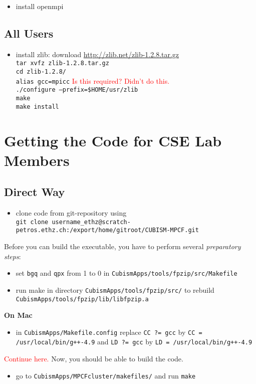 \documentclass[a4paper,10pt]{article}
\begin{document}
\begin{itemize}
\item install openmpi
\end{itemize}

\subsection*{All Users}

\begin{itemize}
\item install zlib: download \url{http://zlib.net/zlib-1.2.8.tar.gz}\\
         \texttt{tar xvfz zlib-1.2.8.tar.gz}\\
         \texttt{cd zlib-1.2.8/}\\
         \texttt{alias gcc=mpicc} \textcolor{red}{Is this required? Didn't do this.}\\
         \texttt{./configure --prefix=\$HOME/usr/zlib}\\
         \texttt{make}\\
         \texttt{make install}
\end{itemize}

\section{Getting the Code for CSE Lab Members}

\subsection*{Direct Way}

\begin{itemize}
\item clone code from git-repository using\\
         \texttt{git clone username\_ethz@scratch-petros.ethz.ch:/export/home/gitroot/CUBISM-MPCF.git}
\end{itemize}
Before you can build the executable, you have to perform several \textit{preparatory steps}:
\begin{itemize}
\item set \texttt{bgq} and \texttt{qpx} from 1 to 0 in \texttt{CubismApps/tools/fpzip/src/Makefile} 
\item run make in directory \texttt{CubismApps/tools/fpzip/src/} to rebuild \texttt{CubismApps/tools/fpzip/\linebreak lib/libfpzip.a}
\end{itemize}
\textbf{On Mac}
\begin{itemize}
\item in \texttt{CubismApps/Makefile.config} replace \texttt{CC ?= gcc} by \texttt{CC = /usr/local/bin/g++-4.9} and \texttt{LD ?= gcc} by \texttt{LD = /usr/local/bin/g++-4.9}
\end{itemize}
\textcolor{red}{Continue here.}
Now, you should be able to build the code.
\begin{itemize}
\item go to \texttt{CubismApps/MPCFcluster/makefiles/} and run \texttt{make}
\end{itemize}
\end{document}
